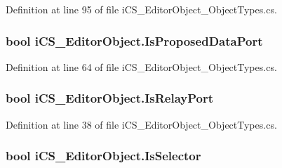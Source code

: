 Definition at line 95 of file i\+C\+S\+\_\+\+Editor\+Object\+\_\+\+Object\+Types.\+cs.

\hypertarget{classi_c_s___editor_object_a027ddc46a3231b33f2252a661e544647}{
\subsubsection[{Is\+Proposed\+Data\+Port}]{\setlength{\rightskip}{0pt plus 5cm}bool i\+C\+S\+\_\+\+Editor\+Object.\+Is\+Proposed\+Data\+Port\hspace{0.3cm}{\ttfamily [get]}}}\label{classi_c_s___editor_object_a027ddc46a3231b33f2252a661e544647}


Definition at line 64 of file i\+C\+S\+\_\+\+Editor\+Object\+\_\+\+Object\+Types.\+cs.

\hypertarget{classi_c_s___editor_object_a4cef3dc511d5fd98a139b2e6590b4797}{
\subsubsection[{Is\+Relay\+Port}]{\setlength{\rightskip}{0pt plus 5cm}bool i\+C\+S\+\_\+\+Editor\+Object.\+Is\+Relay\+Port\hspace{0.3cm}{\ttfamily [get]}}}\label{classi_c_s___editor_object_a4cef3dc511d5fd98a139b2e6590b4797}


Definition at line 38 of file i\+C\+S\+\_\+\+Editor\+Object\+\_\+\+Object\+Types.\+cs.

\hypertarget{classi_c_s___editor_object_abc43d8060534338a6f08ed6a002fc319}{
\subsubsection[{Is\+Selector}]{\setlength{\rightskip}{0pt plus 5cm}bool i\+C\+S\+\_\+\+Editor\+Object.\+Is\+Selector\hspace{0.3cm}{\ttfamily [get]}}}\label{classi_c_s___editor_object_abc43d8060534338a6f08ed6a002fc319}


